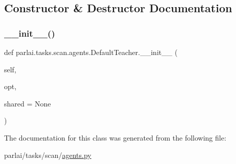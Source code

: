 \subsection{Constructor \& Destructor Documentation}
\mbox{\label{classparlai_1_1tasks_1_1scan_1_1agents_1_1DefaultTeacher_a113f70356b142f1e9db8e80362287876}} 
\subsubsection{\texorpdfstring{\+\_\+\+\_\+init\+\_\+\+\_\+()}{\_\_init\_\_()}}
{\footnotesize\ttfamily def parlai.\+tasks.\+scan.\+agents.\+Default\+Teacher.\+\_\+\+\_\+init\+\_\+\+\_\+ (\begin{DoxyParamCaption}\item[{}]{self,  }\item[{}]{opt,  }\item[{}]{shared = {\ttfamily None} }\end{DoxyParamCaption})}



The documentation for this class was generated from the following file\+:\begin{DoxyCompactItemize}
\item 
parlai/tasks/scan/\hyperlink{parlai_2tasks_2scan_2agents_8py}{agents.\+py}\end{DoxyCompactItemize}
